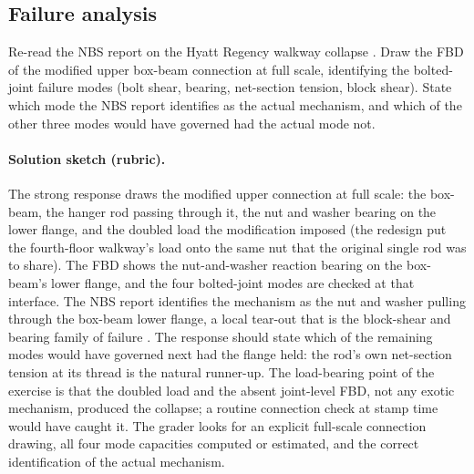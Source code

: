 \subsection*{Failure analysis}

\begin{exercise}
Re-read the NBS report on the Hyatt Regency walkway collapse \cite{
acc:nbs-hyatt-1982}. Draw the FBD of the modified upper box-beam
connection at full scale, identifying the bolted-joint failure
modes (bolt shear, bearing, net-section tension, block shear). State
which mode the NBS report identifies as the actual mechanism, and
which of the other three modes would have governed had the actual
mode not.

\paragraph{Solution sketch (rubric).} The strong response draws the
modified upper connection at full scale: the box-beam, the hanger rod
passing through it, the nut and washer bearing on the lower flange, and
the doubled load the modification imposed (the redesign put the
fourth-floor walkway's load onto the same nut that the original single
rod was to share). The FBD shows the nut-and-washer reaction bearing on
the box-beam's lower flange, and the four bolted-joint modes are checked
at that interface. The NBS report identifies the mechanism as the nut
and washer pulling through the box-beam lower flange, a local tear-out
that is the block-shear and bearing family of failure
\cite{acc:nbs-hyatt-1982}. The response should state which of the
remaining modes would have governed next had the flange held: the rod's
own net-section tension at its thread is the natural runner-up. The
load-bearing point of the exercise is that the doubled load and the
absent joint-level FBD, not any exotic mechanism, produced the collapse;
a routine connection check at stamp time would have caught it. The
grader looks for an explicit full-scale connection drawing, all four
mode capacities computed or estimated, and the correct identification of
the actual mechanism.
\end{exercise}

